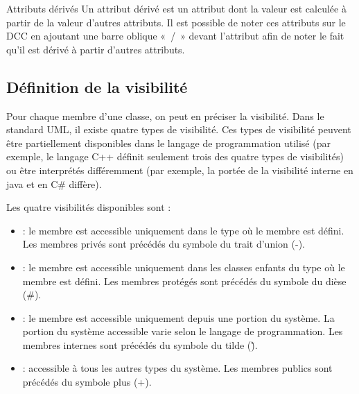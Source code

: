 \begin{extra}{Attributs dérivés}
	Un attribut dérivé est un attribut dont la valeur est calculée à partir de la valeur d'autres attributs. Il est possible de noter ces attributs sur le DCC en ajoutant une barre oblique «~/~» devant l'attribut afin de noter le fait qu'il est dérivé à partir d'autres attributs.
\end{extra}

\subsection{Définition de la visibilité}

Pour chaque membre d'une classe, on peut en préciser la visibilité. Dans le standard UML, il existe quatre types de visibilité. Ces types de visibilité peuvent être partiellement disponibles dans le langage de programmation utilisé (par exemple, le langage C++ définit seulement trois des quatre types de visibilités) ou être interprétés différemment (par exemple, la portée de la visibilité interne en java et en C\# diffère).

Les quatre visibilités disponibles sont :
\begin{itemize}
	\item {} : le membre est accessible uniquement dans le type où le membre est défini. Les membres privés sont précédés du symbole du trait d'union (-).
	\item {} : le membre est accessible uniquement dans les classes \glspl{enfant} du type où le membre est défini. Les membres protégés sont précédés du symbole du dièse (\#).
	\item {} : le membre est accessible uniquement depuis une portion du système. La portion du système accessible varie selon le langage de programmation. Les membres internes sont précédés du symbole du tilde (\~).
	\item {} : accessible à tous les autres types du système. Les membres publics sont précédés du symbole plus (+).
\end{itemize}

